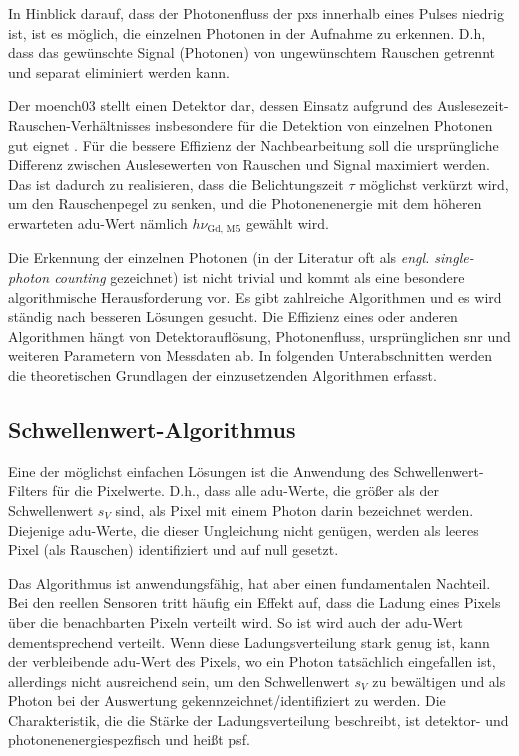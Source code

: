 \noindent
In Hinblick darauf, dass der Photonenfluss der \gls{pxs} innerhalb eines Pulses niedrig ist, ist es möglich, die einzelnen Photonen in der Aufnahme zu erkennen. D.h, dass das gewünschte Signal (Photonen) von ungewünschtem Rauschen getrennt und separat eliminiert werden kann.

\noindent
Der \gls{moench03} stellt einen Detektor dar, dessen Einsatz aufgrund des Auslesezeit-Rauschen-Ver\-hält\-nis\-ses insbesondere für die Detektion von einzelnen Photonen gut eignet \cite{bergamaschi_monch_2018}. Für die bessere Effizienz der Nachbearbeitung soll die ursprüngliche Differenz zwischen Auslesewerten von Rauschen und Signal maximiert werden. Das ist dadurch zu realisieren, dass die Belichtungszeit $\tau$ möglichst verkürzt wird, um den Rauschenpegel zu senken, und die Photonenenergie mit dem höheren erwarteten \gls{adu}-Wert nämlich $h\nu_{\text{Gd, M5}}$ gewählt wird.

\noindent
Die Erkennung der einzelnen Photonen (in der Literatur oft als \emph{engl. single-photon counting} gezeichnet) ist nicht trivial und kommt als eine besondere algorithmische Herausforderung vor. Es gibt zahlreiche Algorithmen und es wird ständig nach besseren Lösungen gesucht. Die Effizienz eines oder anderen Algorithmen hängt von Detektorauflösung, Photonenfluss, ursprünglichen \gls{snr} und weiteren Parametern von Messdaten ab. In folgenden Unterabschnitten werden die theoretischen Grundlagen der einzusetzenden Algorithmen erfasst.

\subsection{Schwellenwert-Algorithmus}
\label{text:threshold_algorithm}
Eine der möglichst einfachen Lösungen ist die Anwendung des Schwellenwert-Filters für die Pixelwerte. D.h., dass alle \gls{adu}-Werte, die größer als der Schwellenwert $s_V$ sind, als Pixel mit einem Photon darin bezeichnet werden. Diejenige \gls{adu}-Werte, die dieser Ungleichung nicht genügen, werden als leeres Pixel (als Rauschen) identifiziert und auf null gesetzt.

\noindent
Das Algorithmus ist anwendungsfähig, hat aber einen fundamentalen Nachteil. Bei den reellen Sensoren tritt häufig ein Effekt auf, dass die Ladung eines Pixels über die benachbarten Pixeln verteilt wird. So ist wird auch der \gls{adu}-Wert dementsprechend verteilt. Wenn diese Ladungsverteilung  stark genug ist, kann der verbleibende \gls{adu}-Wert des Pixels, wo ein Photon tatsächlich eingefallen ist, allerdings nicht ausreichend sein, um den Schwellenwert $s_V$ zu bewältigen und als Photon bei der Auswertung gekennzeichnet/identifiziert zu werden. Die Charakteristik, die die Stärke der Ladungsverteilung beschreibt, ist detektor- und photonenenergiespezfisch und heißt \gls{psf}.

